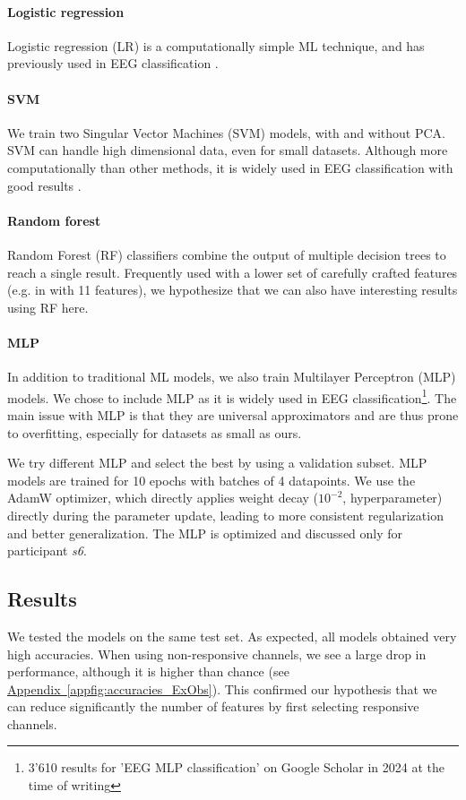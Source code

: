 \documentclass[10pt,conference,compsocconf]{IEEEtran}
\newcommand{\aref}[1]{\hyperref[#1]{Appendix~\ref*{#1}}}
\begin{document}
\paragraph{Logistic regression}
Logistic regression (LR) is a computationally simple ML technique, and has previously used in EEG classification \cite{SUBASI200587, NIPS2006_35937e34}.

\paragraph{SVM}
We train two Singular Vector Machines (SVM) models, with and without PCA. SVM can handle high dimensional data, even for small datasets. Although more computationally than other methods, it is widely used in EEG classification with good results \cite{knn_svm_review}.

\paragraph{Random forest}
Random Forest (RF) classifiers combine the output of multiple decision trees to reach a single result. Frequently used with a lower set of carefully crafted features (e.g. in \cite{eegrfclassif} with 11 features), we hypothesize that we can also have interesting results using RF here.

\paragraph{MLP}
In addition to traditional ML models, we also train Multilayer Perceptron (MLP) models. We chose to include MLP as it is widely used in EEG classification\footnote{3'610 results for 'EEG MLP classification' on Google Scholar in 2024 at the time of writing}. The main issue with MLP is that they are universal approximators and are thus prone to overfitting, especially for datasets as small as ours.

We try different MLP and select the best by using a validation subset. MLP models are trained for 10 epochs with batches of 4 datapoints. We use the AdamW optimizer, which directly applies weight decay (\(10^{-2}\), hyperparameter) directly during the parameter update, leading to more consistent regularization and better generalization. The MLP is optimized and discussed only for participant \textit{s6}.

\subsection{Results}
We tested the models on the same test set. As expected, all models obtained very high accuracies. When using non-responsive channels, we see a large drop in performance, although it is higher than chance (see \aref{appfig:accuracies_ExObs}). This confirmed our hypothesis that we can reduce significantly the number of features by first selecting responsive channels.
\end{document}
